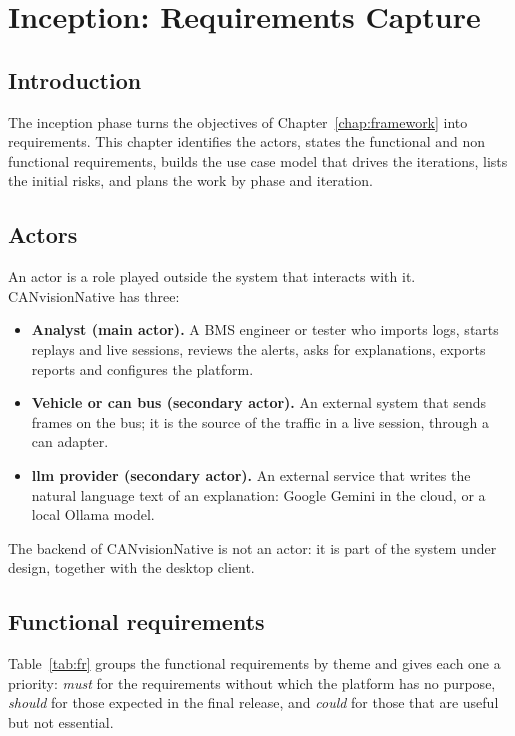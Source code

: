 \chapter{Inception: Requirements Capture}
\label{chap:inception}

\section*{Introduction}

The inception phase turns the objectives of Chapter~\ref{chap:framework} into requirements. This chapter identifies the actors, states the functional and non functional requirements, builds the use case model that drives the iterations, lists the initial risks, and plans the work by phase and iteration.

\section{Actors}
\label{sec:actors}

An actor is a role played outside the system that interacts with it. CANvisionNative has three:

\begin{itemize}
    \item \textbf{Analyst (main actor).} A BMS engineer or tester who imports logs, starts replays and live sessions, reviews the alerts, asks for explanations, exports reports and configures the platform.
    \item \textbf{Vehicle or \gls{can} bus (secondary actor).} An external system that sends frames on the bus; it is the source of the traffic in a live session, through a \gls{can} adapter.
    \item \textbf{\gls{llm} provider (secondary actor).} An external service that writes the natural language text of an explanation: Google Gemini in the cloud, or a local Ollama model.
\end{itemize}

The backend of CANvisionNative is not an actor: it is part of the system under design, together with the desktop client.

\section{Functional requirements}
\label{sec:fr}

Table~\ref{tab:fr} groups the functional requirements by theme and gives each one a priority: \emph{must} for the requirements without which the platform has no purpose, \emph{should} for those expected in the final release, and \emph{could} for those that are useful but not essential.

